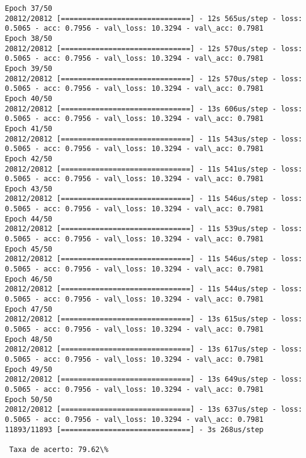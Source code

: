 \documentclass[11pt]{article}
\begin{document}
\begin{Verbatim}[commandchars=\\\{\}]
Epoch 37/50
20812/20812 [==============================] - 12s 565us/step - loss: 0.5065 - acc: 0.7956 - val\_loss: 10.3294 - val\_acc: 0.7981
Epoch 38/50
20812/20812 [==============================] - 12s 570us/step - loss: 0.5065 - acc: 0.7956 - val\_loss: 10.3294 - val\_acc: 0.7981
Epoch 39/50
20812/20812 [==============================] - 12s 570us/step - loss: 0.5065 - acc: 0.7956 - val\_loss: 10.3294 - val\_acc: 0.7981
Epoch 40/50
20812/20812 [==============================] - 13s 606us/step - loss: 0.5065 - acc: 0.7956 - val\_loss: 10.3294 - val\_acc: 0.7981
Epoch 41/50
20812/20812 [==============================] - 11s 543us/step - loss: 0.5065 - acc: 0.7956 - val\_loss: 10.3294 - val\_acc: 0.7981
Epoch 42/50
20812/20812 [==============================] - 11s 541us/step - loss: 0.5065 - acc: 0.7956 - val\_loss: 10.3294 - val\_acc: 0.7981
Epoch 43/50
20812/20812 [==============================] - 11s 546us/step - loss: 0.5065 - acc: 0.7956 - val\_loss: 10.3294 - val\_acc: 0.7981
Epoch 44/50
20812/20812 [==============================] - 11s 539us/step - loss: 0.5065 - acc: 0.7956 - val\_loss: 10.3294 - val\_acc: 0.7981
Epoch 45/50
20812/20812 [==============================] - 11s 546us/step - loss: 0.5065 - acc: 0.7956 - val\_loss: 10.3294 - val\_acc: 0.7981
Epoch 46/50
20812/20812 [==============================] - 11s 544us/step - loss: 0.5065 - acc: 0.7956 - val\_loss: 10.3294 - val\_acc: 0.7981
Epoch 47/50
20812/20812 [==============================] - 13s 615us/step - loss: 0.5065 - acc: 0.7956 - val\_loss: 10.3294 - val\_acc: 0.7981
Epoch 48/50
20812/20812 [==============================] - 13s 617us/step - loss: 0.5065 - acc: 0.7956 - val\_loss: 10.3294 - val\_acc: 0.7981
Epoch 49/50
20812/20812 [==============================] - 13s 649us/step - loss: 0.5065 - acc: 0.7956 - val\_loss: 10.3294 - val\_acc: 0.7981
Epoch 50/50
20812/20812 [==============================] - 13s 637us/step - loss: 0.5065 - acc: 0.7956 - val\_loss: 10.3294 - val\_acc: 0.7981
11893/11893 [==============================] - 3s 268us/step

 Taxa de acerto: 79.62\%

    \end{Verbatim}

    \begin{center}
    \end{center}
    { \hspace*{\fill} \\}
    

    
    
    
    
\end{document}
